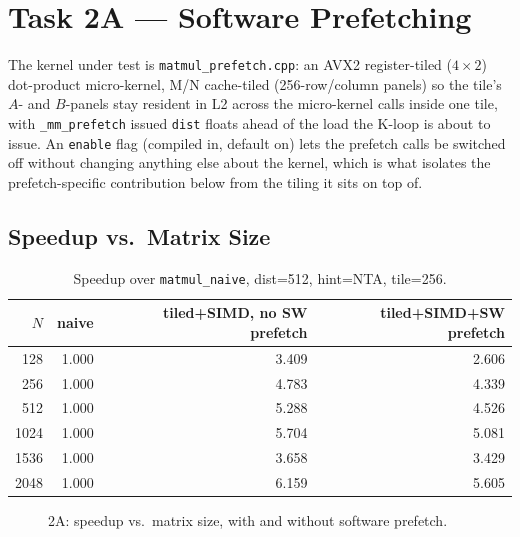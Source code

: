 \documentclass[11pt]{article}
\begin{document}
\section{Task 2A --- Software Prefetching}

The kernel under test is \texttt{matmul\_prefetch.cpp}: an AVX2 register-tiled
($4\times2$) dot-product micro-kernel, M/N cache-tiled (256-row/column panels) so the
tile's $A$- and $B$-panels stay resident in L2 across the micro-kernel calls inside one
tile, with \texttt{\_mm\_prefetch} issued \texttt{dist} floats ahead of the load the
K-loop is about to issue. An \texttt{enable} flag (compiled in, default on) lets the
prefetch calls be switched off without changing anything else about the kernel, which is
what isolates the prefetch-specific contribution below from the tiling it sits on top of.

\subsection{Speedup vs.\ Matrix Size}

\begin{table}[h]
\centering
\begin{tabular}{r r r r}
\toprule
$N$ & {naive} & {tiled+SIMD, no SW prefetch} & {tiled+SIMD+SW prefetch} \\
\midrule
128  & 1.000 & 3.409 & 2.606 \\
256  & 1.000 & 4.783 & 4.339 \\
512  & 1.000 & 5.288 & 4.526 \\
1024 & 1.000 & 5.704 & 5.081 \\
1536 & 1.000 & 3.658 & 3.429 \\
2048 & 1.000 & 6.159 & 5.605 \\
\bottomrule
\end{tabular}
\caption{Speedup over \texttt{matmul\_naive}, dist=512, hint=NTA, tile=256.}
\end{table}

\begin{figure}[h]
\centering
{}
\caption{2A: speedup vs.\ matrix size, with and without software prefetch.}
\end{figure}
\end{document}
